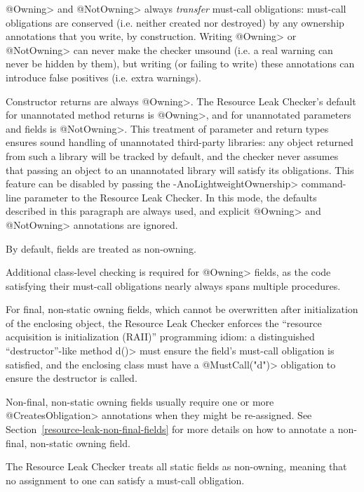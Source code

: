 \<@Owning> and \<@NotOwning> always \emph{transfer} must-call obligations: must-call
obligations are conserved (i.e. neither created nor destroyed) by any ownership annotations
that you write, by construction. Writing \<@Owning> or \<@NotOwning> can never make the checker
unsound (i.e. a real warning can never be hidden by them),
but writing (or failing to write) these annotations can introduce false positives (i.e. extra warnings).

Constructor returns are always \<@Owning>.
The Resource Leak Checker's default for unannotated method returns is \<@Owning>,
and for unannotated parameters and fields is \<@NotOwning>. This treatment of parameter and
return types ensures sound handling of unannotated third-party libraries: any
object returned from such a library will be tracked by default, and the checker
never assumes that passing an object to an unannotated library will satisfy its obligations.
This feature can be disabled by passing the \<-AnoLightweightOwnership> command-line parameter to the Resource
Leak Checker. In this mode, the defaults described in this paragraph are always used, and explicit \<@Owning>
and \<@NotOwning> annotations are ignored.



By default, fields are treated as non-owning.

Additional class-level checking is required for \<@Owning>
fields, as the code
satisfying their must-call obligations nearly always spans multiple
procedures.

For final, non-static owning fields,
which cannot be overwritten after initialization of the enclosing
object, the Resource Leak Checker enforces the ``resource acquisition is
initialization (RAII)'' programming idiom: a distinguished
``destructor''-like method \<d()> must ensure the field's must-call obligation is
satisfied, and the enclosing class must have a \<@MustCall("d")> obligation to
ensure the destructor is called.

Non-final, non-static owning fields usually require one or more \<@CreatesObligation> annotations
when they might be re-assigned. See Section~\ref{resource-leak-non-final-fields} for
more details on how to annotate a non-final, non-static owning field.

The Resource Leak Checker treats all static fields as non-owning, meaning that no assignment to one
can satisfy a must-call obligation.



